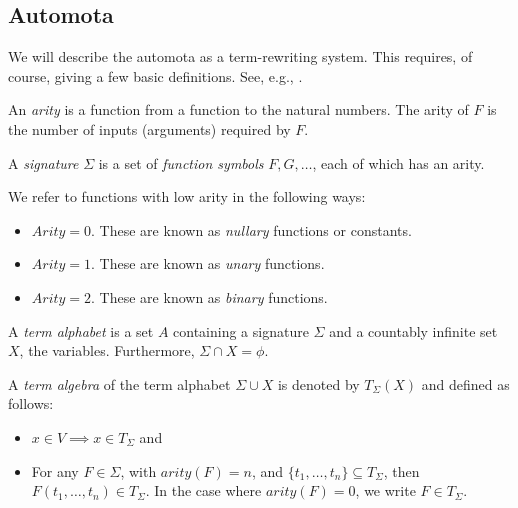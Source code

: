 \subsection{Automota} %
\label{sub:automota}
We will describe the automota as a term-rewriting system. This requires, of course, giving a 
few basic definitions. See, e.g., \cite{termrewriting2003}.
\begin{definition}\label{def:arity}
  An \emph{arity} is a function from a function to the natural numbers. The arity of
  $F$ is the number of inputs (arguments) required by $F$.
\end{definition} 
\begin{definition}\label{def:signature}
  A \emph{signature} $\Sigma$ is a set of \emph{function symbols} $F,G,\ldots$, each of which
  has an arity.  
\end{definition}

\begin{remark}
  We refer to functions with low arity in the following ways:
  \begin{itemize}
    \item $Arity = 0$.  These are known as \emph{nullary} functions or constants.
    \item $Arity = 1$.  These are known as \emph{unary} functions.
    \item $Arity = 2$.  These are known as \emph{binary} functions.
  \end{itemize}
\end{remark}

\begin{definition}\label{def:term_alphabet}
  A \emph{term alphabet} is a set $A$ containing a signature $\Sigma$ and a countably infinite 
  set $X$, the variables. Furthermore, $\Sigma \cap X = \phi$.
\end{definition}

\begin{definition}\label{def:term_algebra}
  A \emph{term algebra} of the term alphabet  $\Sigma \cup X$ is denoted by $T_\Sigma(X)$ and 
  defined as follows:
  \begin{itemize}
    \item $x\in V \implies x \in T_\Sigma$ and
    \item For any $F\in\Sigma$, with $arity(F) = n$, and $\{t_1,\ldots,t_n\} \subseteq T_\Sigma$,
    then $F(t_1,\ldots,t_n)\in T_\Sigma$. In the case where $arity(F) = 0$, we write 
    $F \in T_\Sigma$.
  \end{itemize}
\end{definition}

